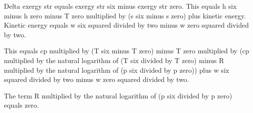 Delta exergy str equals exergy str six minus exergy str zero.  
This equals h six minus h zero minus T zero multiplied by (s six minus s zero) plus kinetic energy.  
Kinetic energy equals w six squared divided by two minus w zero squared divided by two.  

This equals cp multiplied by (T six minus T zero) minus T zero multiplied by (cp multiplied by the natural logarithm of (T six divided by T zero) minus R multiplied by the natural logarithm of (p six divided by p zero)) plus w six squared divided by two minus w zero squared divided by two.  

The term R multiplied by the natural logarithm of (p six divided by p zero) equals zero.
